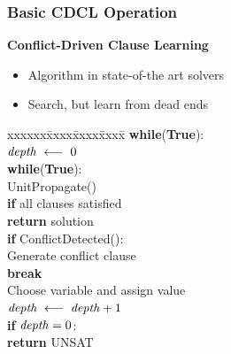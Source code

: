 \documentclass[t,pdf]{beamer}
\newcommand{\keyword}[1]{\textbf{#1}}
\newcommand{\keyif}{\keyword{if}}
\newcommand{\keywhile}{\keyword{while}}
\newcommand{\keytrue}{\keyword{True}}
\newcommand{\keybreak}{\keyword{break}}
\newcommand{\keyreturn}{\keyword{return}}
\newcommand{\assign}{\ensuremath{\longleftarrow}}
\begin{document}
\begin{frame}
  \frametitle{Basic CDCL Operation}

  {\bf Conflict-Driven Clause Learning}
  \begin{itemize}
    \item Algorithm in state-of-the art solvers
    \item Search, but learn from dead ends
  \end{itemize}

\begin{tabbing}
xxxxxx\=xxxx\=xxxx\=xxxx\=\kill
\>\keywhile(\keytrue): \\
\>\>${\it depth}\; \assign \;0$ \\
\>\>\keywhile(\keytrue): \\
\>\>\>UnitPropagate() \\
\>\>\>\keyif{} all clauses satisfied \\
\>\>\>\>\keyreturn{} solution\\
\>\>\>\keyif{} ConflictDetected(): \\
\>\>\>\>Generate conflict clause \\
\>\>\>\>\keybreak{} \\
\>\>\>Choose variable and assign value\\
\>\>\>${\it depth} \;\assign \; {\it depth} + 1$ \\
\>\>\keyif{} ${\it depth} = 0$: \\
\>\>\>\keyreturn{} UNSAT\\

\end{tabbing}


\end{frame}
\end{document}
